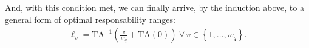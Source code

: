 \documentclass[hidelinks, nonatbib]{elsarticle}
\begin{document}
\begin{enumerate}
And, with this condition met, we can finally arrive, by the induction above, to a general form of optimal responsability ranges:
\begin{gather}
    \ell_v
    =
    \text{TA}^{-1}\left(
        \frac{v}{w_q}
        +
        \text{TA}(0)
    \right)
    \
    \forall
    \
    v \in 
    \left\{
        1, \dots, w_q
    \right\}
    .
\end{gather}




\end{enumerate}
\end{document}
